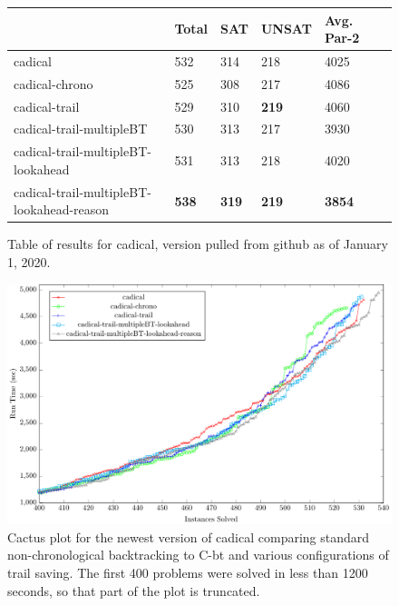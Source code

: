 \documentclass[runningheads]{llncs}
\newcommand{\cbt}{C-bt\xspace}
\begin{document}
\begin{figure}
\centering
    \begin{tabular}{|l|l|l|l|l|l|}
      \hline
      & Total & SAT & UNSAT & Avg. Par-2 \\ \hline
      cadical                  & 532          & 314 &  218  & 4025                             \\ \hline
      cadical-chrono          & 525          & 308 &  217  & 4086                             \\ \hline
      cadical-trail           & 529          & 310 &  \textbf{219}  & 4060                   \\ \hline
      cadical-trail-multipleBT & 530 & 313 & 217 & 3930 \\ \hline
      cadical-trail-multipleBT-lookahead & 531          & 313 &  218  & 4020                      \\ \hline
      cadical-trail-multipleBT-lookahead-reason & \textbf{538} & \textbf{319} & \textbf{219} & \textbf{3854} \\ \hline
    \end{tabular}
    \caption{Table of results for cadical, version pulled from github as of January 1, 2020.}
    \label{fig:cadicalNew}
\end{figure}

\begin{figure}\centering\includegraphics[scale=0.65]{figures/cactus_cadical_new.pdf}\caption{\small{Cactus plot for the newest version of cadical comparing standard non-chronological backtracking to \cbt and various configurations of trail saving. The first 400 problems were solved in less than 1200 seconds, so that part of the plot is truncated.}}\label{fig:cactus_cadical}\end{figure}
\end{document}
